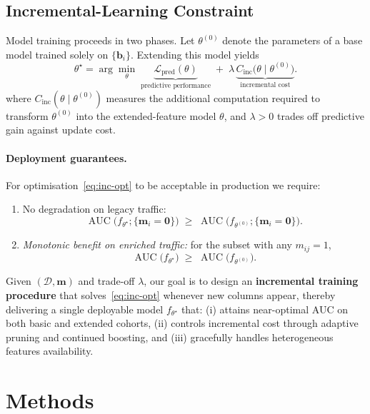 \documentclass[sigconf]{acmart}
\begin{document}
\begin{itemize}
\subsection{Incremental-Learning Constraint}

Model training proceeds in two phases.  Let \(\theta^{(0)}\) denote the parameters of
a base model trained solely on \(\{\mathbf{b}_i\}\).  Extending this model
yields
\begin{equation}
\label{eq:inc-opt}
\theta^{\star}
=
\arg\!\min_{\theta}
\;
\underbrace{\mathcal L_{\mathrm{pred}}(\theta)}_{\text{predictive performance}}
\;+\;
\lambda\,\underbrace{C_{\mathrm{inc}}\!\bigl(\theta\mid\theta^{(0)}\bigr)}_{\text{incremental cost}}.
\end{equation}
where \(C_{\mathrm{inc}}(\theta\mid\theta^{(0)})\) measures the additional computation
required to transform \(\theta^{(0)}\) into the extended-feature model \(\theta\),
and \(\lambda>0\) trades off predictive gain against update cost.

\paragraph{Deployment guarantees.}
For optimisation~\eqref{eq:inc-opt} to be acceptable in production we require:

\begin{enumerate}[label=(\Roman*)]
\item No degradation on legacy traffic:
\[
\operatorname{AUC}\!\bigl(f_{\theta^{\star}};\{\mathbf{m}_i=\mathbf 0\}\bigr)
\;\ge\;
\operatorname{AUC}\!\bigl(f_{\theta^{(0)}};\{\mathbf{m}_i=\mathbf 0\}\bigr).
\]

\item \emph{Monotonic benefit on enriched traffic:}
for the subset with any \(m_{ij}=1\),
\[
\operatorname{AUC}\!\bigl(f_{\theta^{\star}}\bigr)
\;\ge\;
\operatorname{AUC}\!\bigl(f_{\theta^{(0)}}\bigr).
\]
\end{enumerate}

Given \((\mathcal D,\mathbf m)\) and trade-off \(\lambda\), our goal is to design an
\textbf{incremental training procedure} that solves~\eqref{eq:inc-opt} whenever new
columns appear, thereby delivering a single deployable model
\(f_{\theta^{\star}}\) that: (i) attains near-optimal AUC on both basic and
extended cohorts, (ii) controls incremental cost through adaptive pruning and
continued boosting, and (iii) gracefully handles heterogeneous features
availability.

\section{Methods}
\label{sec:method}


\end{itemize}
\end{document}
